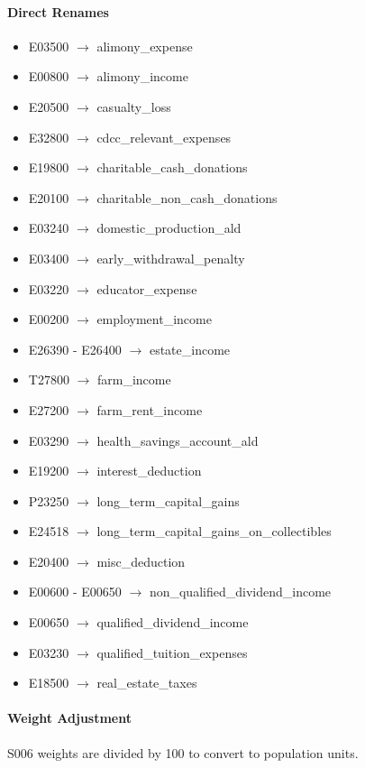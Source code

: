 \paragraph{Direct Renames}
\begin{itemize}
    \item E03500 $\rightarrow$ alimony\_expense
    \item E00800 $\rightarrow$ alimony\_income
    \item E20500 $\rightarrow$ casualty\_loss
    \item E32800 $\rightarrow$ cdcc\_relevant\_expenses
    \item E19800 $\rightarrow$ charitable\_cash\_donations
    \item E20100 $\rightarrow$ charitable\_non\_cash\_donations
    \item E03240 $\rightarrow$ domestic\_production\_ald
    \item E03400 $\rightarrow$ early\_withdrawal\_penalty
    \item E03220 $\rightarrow$ educator\_expense
    \item E00200 $\rightarrow$ employment\_income
    \item E26390 - E26400 $\rightarrow$ estate\_income
    \item T27800 $\rightarrow$ farm\_income
    \item E27200 $\rightarrow$ farm\_rent\_income
    \item E03290 $\rightarrow$ health\_savings\_account\_ald
    \item E19200 $\rightarrow$ interest\_deduction
    \item P23250 $\rightarrow$ long\_term\_capital\_gains
    \item E24518 $\rightarrow$ long\_term\_capital\_gains\_on\_collectibles
    \item E20400 $\rightarrow$ misc\_deduction
    \item E00600 - E00650 $\rightarrow$ non\_qualified\_dividend\_income
    \item E00650 $\rightarrow$ qualified\_dividend\_income
    \item E03230 $\rightarrow$ qualified\_tuition\_expenses
    \item E18500 $\rightarrow$ real\_estate\_taxes
\end{itemize}

\paragraph{Weight Adjustment}
S006 weights are divided by 100 to convert to population units.


